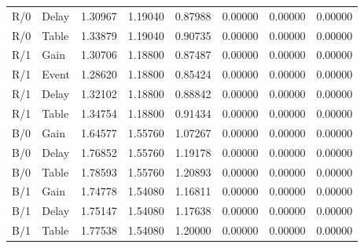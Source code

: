 \begin{longtable}{llllllll}
R/0 & Delay & 1.30967 & 1.19040 & 0.87988 & 0.00000 & 0.00000 & 0.00000 \\
R/0 & Table & 1.33879 & 1.19040 & 0.90735 & 0.00000 & 0.00000 & 0.00000 \\
R/1 & Gain & 1.30706 & 1.18800 & 0.87487 & 0.00000 & 0.00000 & 0.00000 \\
R/1 & Event & 1.28620 & 1.18800 & 0.85424 & 0.00000 & 0.00000 & 0.00000 \\
R/1 & Delay & 1.32102 & 1.18800 & 0.88842 & 0.00000 & 0.00000 & 0.00000 \\
R/1 & Table & 1.34754 & 1.18800 & 0.91434 & 0.00000 & 0.00000 & 0.00000 \\
B/0 & Gain & 1.64577 & 1.55760 & 1.07267 & 0.00000 & 0.00000 & 0.00000 \\
B/0 & Delay & 1.76852 & 1.55760 & 1.19178 & 0.00000 & 0.00000 & 0.00000 \\
B/0 & Table & 1.78593 & 1.55760 & 1.20893 & 0.00000 & 0.00000 & 0.00000 \\
B/1 & Gain & 1.74778 & 1.54080 & 1.16811 & 0.00000 & 0.00000 & 0.00000 \\
B/1 & Delay & 1.75147 & 1.54080 & 1.17638 & 0.00000 & 0.00000 & 0.00000 \\
B/1 & Table & 1.77538 & 1.54080 & 1.20000 & 0.00000 & 0.00000 & 0.00000 \\
\bottomrule
\end{longtable}
